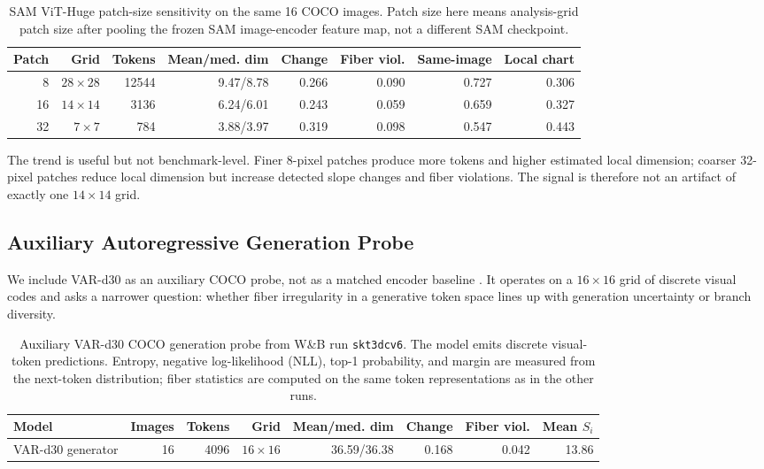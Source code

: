 \documentclass{article}
\newcommand{\dataset}[1]{\textsc{#1}}
\begin{document}
\begin{table}[H]
\centering
\scriptsize
\caption{SAM ViT-Huge patch-size sensitivity on the same 16 \dataset{COCO} images. Patch size here means analysis-grid patch size after pooling the frozen SAM image-encoder feature map, not a different SAM checkpoint.}
\begin{tabular}{@{}rrrrrrrr@{}}
\toprule
Patch & Grid & Tokens & Mean/med. dim & Change & Fiber viol. & Same-image & Local chart \\
\midrule
8  & $28\times28$ & 12544 & 9.47/8.78 & 0.266 & 0.090 & 0.727 & 0.306 \\
16 & $14\times14$ & 3136  & 6.24/6.01 & 0.243 & 0.059 & 0.659 & 0.327 \\
32 & $7\times7$   & 784   & 3.88/3.97 & 0.319 & 0.098 & 0.547 & 0.443 \\
\bottomrule
\end{tabular}
\label{tab:sam-patch-size-sweep}
\end{table}

The trend is useful but not benchmark-level. Finer 8-pixel patches produce more tokens and higher estimated local dimension; coarser 32-pixel patches reduce local dimension but increase detected slope changes and fiber violations. The signal is therefore not an artifact of exactly one $14\times14$ grid.

\clearpage

\subsection{Auxiliary Autoregressive Generation Probe}
We include VAR-d30 as an auxiliary \dataset{COCO} probe, not as a matched encoder baseline \citep{tian2024visual}. It operates on a $16\times16$ grid of discrete visual codes and asks a narrower question: whether fiber irregularity in a generative token space lines up with generation uncertainty or branch diversity.

\begin{table}[H]
\centering
\scriptsize
\caption{Auxiliary VAR-d30 \dataset{COCO} generation probe from W\&B run \texttt{skt3dcv6}. The model emits discrete visual-token predictions. Entropy, negative log-likelihood (NLL), top-1 probability, and margin are measured from the next-token distribution; fiber statistics are computed on the same token representations as in the other runs.}
\begin{tabular}{@{}lrrrrrrr@{}}
\toprule
Model & Images & Tokens & Grid & Mean/med. dim & Change & Fiber viol. & Mean $S_i$ \\
\midrule
VAR-d30 generator & 16 & 4096 & $16\times16$ & 36.59/36.38 & 0.168 & 0.042 & 13.86 \\
\bottomrule
\end{tabular}
\label{tab:coco-var}
\end{table}
\end{document}
